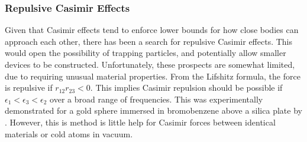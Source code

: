 




\subsubsection{Repulsive Casimir Effects}

Given that Casimir effects tend to enforce lower bounds for how close bodies can approach each other,
there has been a search for repulsive Casimir effects.  This would open the possibility
of trapping particles, and potentially allow smaller devices to be constructed.  
Unfortunately, these prospects are somewhat limited, due to requiring unusual material properties.
From the Lifshitz formula, the force is repulsive if $r_{12}r_{23}<0$.
This implies Casimir repulsion should be possible if $\epsilon_1<\epsilon_3<\epsilon_2$ over a broad range of frequencies.
This was experimentally demonstrated for a gold sphere immersed in bromobenzene above a silica plate
by \citet{Munday2009}.  However, this is method is little help for Casimir forces between
identical materials or cold atoms in vacuum.  

